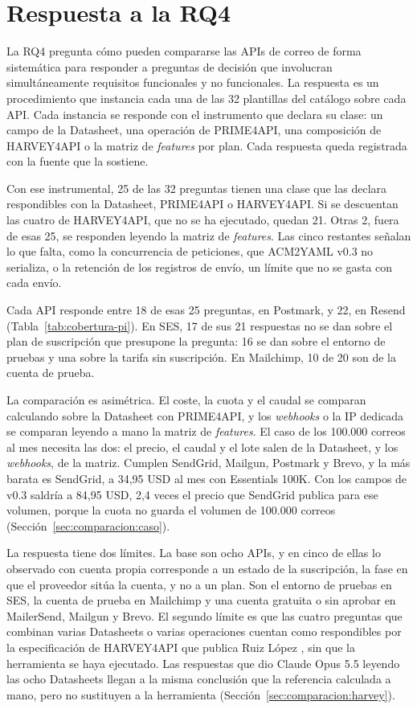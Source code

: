\section{Respuesta a la RQ4}
\label{sec:comparacion:respuesta}

La RQ4 pregunta cómo pueden compararse las APIs de correo de forma sistemática para responder a preguntas de decisión que involucran simultáneamente requisitos funcionales y no funcionales.
La respuesta es un procedimiento que instancia cada una de las 32 plantillas del catálogo sobre cada API.
Cada instancia se responde con el instrumento que declara su clase: un campo de la Datasheet, una operación de PRIME4API, una composición de HARVEY4API o la matriz de \textit{features} por plan.
Cada respuesta queda registrada con la fuente que la sostiene.

Con ese instrumental, 25 de las 32 preguntas tienen una clase que las declara respondibles con la Datasheet, PRIME4API o HARVEY4API.
Si se descuentan las cuatro de HARVEY4API, que no se ha ejecutado, quedan 21.
Otras 2, fuera de esas 25, se responden leyendo la matriz de \textit{features}.
Las cinco restantes señalan lo que falta, como la concurrencia de peticiones, que ACM2YAML v0.3 no serializa, o la retención de los registros de envío, un límite que no se gasta con cada envío.

Cada API responde entre 18 de esas 25 preguntas, en Postmark, y 22, en Resend (Tabla~\ref{tab:cobertura-pi}).
En SES, 17 de sus 21 respuestas no se dan sobre el plan de suscripción que presupone la pregunta: 16 se dan sobre el entorno de pruebas y una sobre la tarifa sin suscripción.
En Mailchimp, 10 de 20 son de la cuenta de prueba.

La comparación es asimétrica.
El coste, la cuota y el caudal se comparan calculando sobre la Datasheet con PRIME4API, y los \textit{webhooks} o la IP dedicada se comparan leyendo a mano la matriz de \textit{features}.
El caso de los 100.000 correos al mes necesita las dos: el precio, el caudal y el lote salen de la Datasheet, y los \textit{webhooks}, de la matriz.
Cumplen SendGrid, Mailgun, Postmark y Brevo, y la más barata es SendGrid, a 34,95 USD al mes con Essentials 100K.
Con los campos de v0.3 saldría a 84,95 USD, 2,4 veces el precio que SendGrid publica para ese volumen, porque la cuota no guarda el volumen de 100.000 correos (Sección~\ref{sec:comparacion:caso}).

La respuesta tiene dos límites.
La base son ocho APIs, y en cinco de ellas lo observado con cuenta propia corresponde a un estado de la suscripción, la fase en que el proveedor sitúa la cuenta, y no a un plan.
Son el entorno de pruebas en SES, la cuenta de prueba en Mailchimp y una cuenta gratuita o sin aprobar en MailerSend, Mailgun y Brevo.
El segundo límite es que las cuatro preguntas que combinan varias Datasheets o varias operaciones cuentan como respondibles por la especificación de HARVEY4API que publica Ruiz López \citep{ruizlopez2026tfm}, sin que la herramienta se haya ejecutado.
Las respuestas que dio Claude Opus 5.5 leyendo las ocho Datasheets llegan a la misma conclusión que la referencia calculada a mano, pero no sustituyen a la herramienta (Sección~\ref{sec:comparacion:harvey}).
